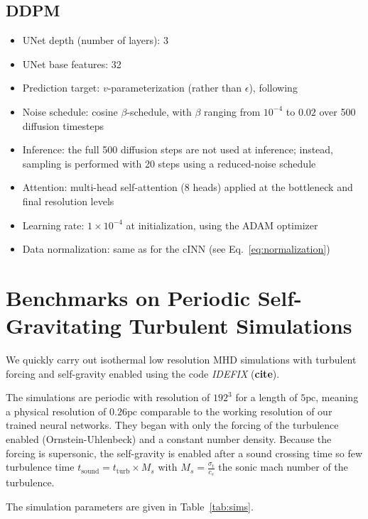 \documentclass{aa}
\begin{document}
\begin{appendix}
   \subsection{DDPM}
      \begin{itemize}
         \item UNet depth (number of layers): 3
         \item UNet base features: 32
         \item Prediction target: $v$-parameterization (rather than $\epsilon$), following \citet{karrasElucidatingDesignSpace2022}
         \item Noise schedule: cosine $\beta$-schedule, with $\beta$ ranging from $10^{-4}$ to $0.02$ over 500 diffusion timesteps
         \item Inference: the full 500 diffusion steps are not used at inference; instead, sampling is performed with 20 steps using a reduced-noise schedule
         \item Attention: multi-head self-attention (8 heads) applied at the bottleneck and final resolution levels \citep{vaswaniAttentionAllYou2023}
         \item Learning rate: $1\times10^{-4}$ at initialization, using the ADAM optimizer
         \item Data normalization: same as for the cINN (see Eq.~\ref{eq:normalization})   
      \end{itemize}

\section{Benchmarks on Periodic Self-Gravitating Turbulent Simulations}
\label{appendix:turb_sims}
   We quickly carry out isothermal low resolution MHD simulations with turbulent forcing and self-gravity enabled using the code \textit{IDEFIX} (\textbf{cite}).
   
   The simulations are periodic with resolution of $192^3$ for a length of $5\mathrm{pc}$, meaning a physical resolution of $0.26\mathrm{pc}$ comparable to the working resolution of our trained neural networks.
   They began with only the forcing of the turbulence enabled (Ornstein-Uhlenbeck) and a constant number density.
   Because the forcing is supersonic, the self-gravity is enabled after a sound crossing time so few turbulence time $t_{\mathrm{sound}}=t_{\mathrm{turb}}\times M_s$ with $M_s=\frac{\sigma_t}{c_s}$ the sonic mach number of the turbulence.

   The simulation parameters are given in Table~\ref{tab:sims}.


\end{appendix}
\end{document}

